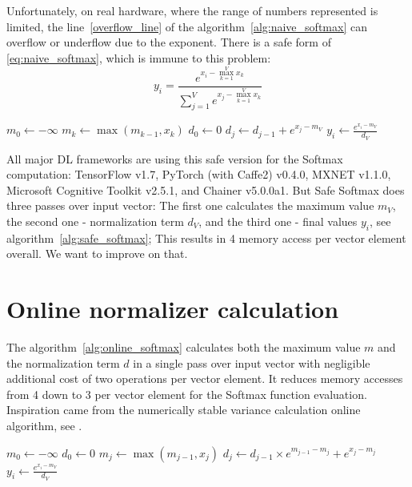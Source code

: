 \documentclass{article}
\begin{document}
Unfortunately, on real hardware, where the range of numbers represented is limited, the line~\ref{overflow_line}  of the algorithm~\ref{alg:naive_softmax} can overflow or underflow due to the exponent. There is a safe form of \eqref{eq:naive_softmax}, which is immune to this problem:
\begin{equation}
\label{eq:safe_softmax}
y_i=\frac{e^{x_i-\max\limits_{k=1}^{V}{x_k}}}{\sum\limits_{j=1}^{V}{e^{x_j-\max\limits_{k=1}^{V}{x_k}}}}
\end{equation}
\begin{algorithm}[ht]
\caption{Safe softmax}
\label{alg:safe_softmax}
\begin{algorithmic}[1]
\State $m_0\gets -\infty$
\State $m_k\gets \max(m_{k-1},{x_k})$
\EndFor
\State $d_0\gets 0$
\State $d_j\gets d_{j-1}+e^{x_j-m_V}$
\EndFor
{}
\State $y_i\gets \frac{e^{x_i-m_V}}{d_V}$
\EndFor
\end{algorithmic}
\end{algorithm}
All major DL frameworks are using this safe version for the Softmax computation: TensorFlow \cite{tensorflow2015-whitepaper} v1.7, PyTorch \cite{paszke2017automatic} (with Caffe2) v0.4.0, MXNET \cite{mxnet_learningsys2015} v1.1.0, Microsoft Cognitive Toolkit \cite{Seide:2016:CMO:2939672.2945397} v2.5.1, and Chainer \cite{chainer_learningsys2015} v5.0.0a1. But Safe Softmax does three passes over input vector: The first one calculates the maximum value $m_V$, the second one - normalization term $d_V$, and the third one - final values $y_i$, see algorithm~\ref{alg:safe_softmax}; This results in 4 memory access per vector element overall. We want to improve on that.

\section{Online normalizer calculation}
The algorithm~\ref{alg:online_softmax} calculates both the maximum value $m$ and the normalization term $d$ in a single pass over input vector with negligible additional cost of two operations per vector element. It reduces memory accesses from 4 down to 3 per vector element for the Softmax function evaluation. Inspiration came from the numerically stable variance calculation online algorithm, see \cite{doi:10.1080/00401706.1962.10490022}.
\begin{algorithm}[ht]
\caption{Safe softmax with online normalizer calculation}
\label{alg:online_softmax}
\begin{algorithmic}[1]
\State $m_0\gets -\infty$\label{alg:start_thm_line}
\State $d_0\gets 0$
\State $m_j\gets \max\left(m_{j-1},x_j\right)$\label{alg:m_line}
\State $d_j\gets d_{j-1}\times e^{m_{j-1}-m_j} +e^{x_j-m_j}$\label{alg:d_line}
\EndFor\label{alg:end_thm_line}
\State $y_i\gets \frac{e^{x_i-m_V}}{d_V}$
\EndFor
\end{algorithmic}
\end{algorithm}
\end{document}
